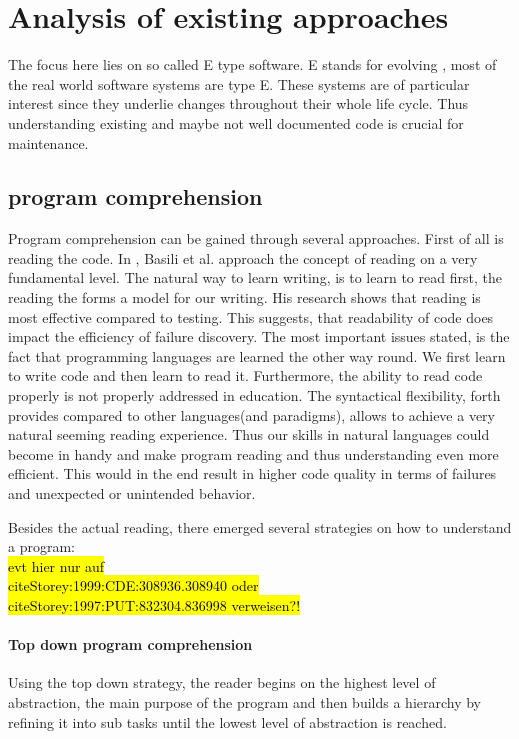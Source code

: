 \chapter{Analysis of existing approaches}

The focus here lies on so called E type software. E stands for evolving \cite{Cook:2006:ESS:1115566.1115567}, most of the real world software systems are type E. These systems are of particular interest since they underlie changes throughout their whole life cycle. Thus understanding existing and maybe not well documented code is crucial for maintenance.

\section{program comprehension}

Program comprehension can be gained through several approaches. First of all is reading the code.
In \cite{Basili:1997:EPR:257260.257262}, Basili et al. approach the concept of reading on a very fundamental level. The natural way to learn writing, is to learn to read first, the reading the forms a model for our writing.  His research shows that reading is most effective compared to testing. This suggests, that readability of code does impact the efficiency of failure discovery. The most important issues stated, is the fact that programming languages are learned the other way round. We first learn to write code and then learn to read it. Furthermore, the ability to read code properly is not properly addressed in education. The syntactical flexibility, forth provides compared to other languages(and paradigms), allows to achieve a very natural seeming reading experience. Thus our skills in natural languages could become in handy and make program reading and thus understanding even more efficient. This would in the end result in higher code quality in terms of failures and unexpected or unintended behavior.

Besides the actual reading, there emerged several strategies on how to understand a program\cite{Storey:1999:CDE:308936.308940}: \\\hl{evt hier nur auf \\cite{Storey:1999:CDE:308936.308940} oder \\cite{Storey:1997:PUT:832304.836998} verweisen?!}
\subsubsection*{Top down program comprehension}
Using the top down strategy, the reader begins on the highest level of abstraction, the main purpose of the program and then builds a hierarchy by refining it into sub tasks until the lowest level of abstraction is reached.
